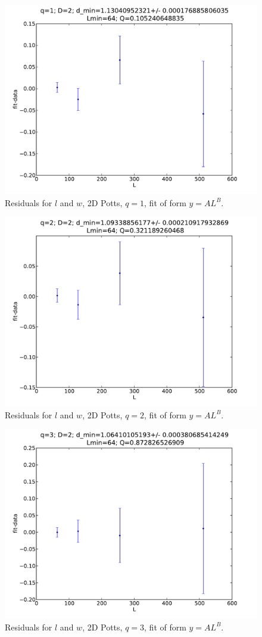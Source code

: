 \documentclass[pre,preprint,11pt]{revtex4}
\begin{document}
\begin{figure}[htp]
\centering
\includegraphics[width=.55\textwidth]{figures/q1D2Lmin64fitplot}
\caption{Residuals for $l$ and $w$, 2D Potts, $q=1$, fit of form $y=AL^B$.}
\end{figure}

\begin{figure}[htp]
\centering
\includegraphics[width=.55\textwidth]{figures/q2D2Lmin64fitplot}
\caption{Residuals for $l$ and $w$, 2D Potts, $q=2$, fit of form $y=AL^B$.}
\end{figure}

\begin{figure}[htp]
\centering
\includegraphics[width=.55\textwidth]{figures/q3D2Lmin64fitplot}
\caption{Residuals for $l$ and $w$, 2D Potts, $q=3$, fit of form $y=AL^B$.}
\end{figure}
\end{document}
